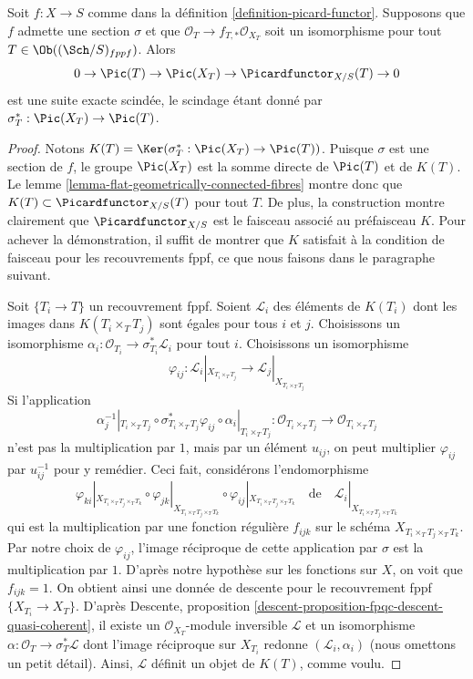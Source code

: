 \begin{lemma}
\label{lemma-flat-geometrically-connected-fibres-with-section}
Soit $f : X \to S$ comme dans la définition \ref{definition-picard-functor}.
Supposons que $f$ admette une section $\sigma$ et que
$\mathcal{O}_T \to f_{T, *}\mathcal{O}_{X_T}$ soit un isomorphisme
pour tout $T \in \Ob((\Sch/S)_{fppf})$. Alors
$$
0 \to \Pic(T) \to \Pic(X_T) \to \Picardfunctor_{X/S}(T) \to 0
$$
est une suite exacte scindée, le scindage étant donné par
$\sigma_T^* : \Pic(X_T) \to \Pic(T)$.
\end{lemma}

\begin{proof}
Notons $K(T) = \Ker(\sigma_T^* : \Pic(X_T) \to \Pic(T))$.
Puisque $\sigma$ est une section de $f$, le groupe $\Pic(X_T)$ est la somme
directe de $\Pic(T)$ et de $K(T)$.
Le lemme \ref{lemma-flat-geometrically-connected-fibres} montre donc que
$K(T) \subset \Picardfunctor_{X/S}(T)$ pour tout $T$. De plus, la construction
montre clairement que $\Picardfunctor_{X/S}$ est le faisceau associé
au préfaisceau $K$. Pour achever la démonstration, il suffit de montrer que
$K$ satisfait à la condition de faisceau pour les recouvrements fppf, ce que nous faisons
dans le paragraphe suivant.

\medskip\noindent
Soit $\{T_i \to T\}$ un recouvrement fppf. Soient $\mathcal{L}_i$ des
éléments de $K(T_i)$ dont les images dans $K(T_i \times_T T_j)$ sont égales
pour tous $i$ et $j$. Choisissons un isomorphisme
$\alpha_i : \mathcal{O}_{T_i} \to \sigma_{T_i}^*\mathcal{L}_i$
pour tout $i$. Choisissons un isomorphisme
$$
\varphi_{ij} :
\mathcal{L}_i|_{X_{T_i \times_T T_j}}
\longrightarrow
\mathcal{L}_j|_{X_{T_i \times_T T_j}}
$$
Si l'application
$$
\alpha_j^{-1}|_{T_i \times_T T_j} \circ
\sigma_{T_i \times_T T_j}^*\varphi_{ij} \circ
\alpha_i|_{T_i \times_T T_j} :
\mathcal{O}_{T_i \times_T T_j} \to \mathcal{O}_{T_i \times_T T_j}
$$
n'est pas la multiplication par $1$, mais par un élément $u_{ij}$, on peut multiplier
$\varphi_{ij}$ par $u_{ij}^{-1}$ pour y remédier. Ceci fait, considérons
l'endomorphisme
$$
\varphi_{ki}|_{X_{T_i \times_T T_j \times_T T_k}} \circ
\varphi_{jk}|_{X_{T_i \times_T T_j \times_T T_k}} \circ
\varphi_{ij}|_{X_{T_i \times_T T_j \times_T T_k}}
\quad\text{de}\quad
\mathcal{L}_i|_{X_{T_i \times_T T_j \times_T T_k}}
$$
qui est la multiplication par une fonction régulière $f_{ijk}$
sur le schéma $X_{T_i \times_T T_j \times_T T_k}$.
Par notre choix de $\varphi_{ij}$, l'image réciproque de
cette application par $\sigma$ est la multiplication par $1$. D'après
notre hypothèse sur les fonctions sur $X$, on voit que $f_{ijk} = 1$.
On obtient ainsi une donnée de descente pour le recouvrement fppf
$\{X_{T_i} \to X_T\}$. D'après
Descente, proposition \ref{descent-proposition-fpqc-descent-quasi-coherent},
il existe un $\mathcal{O}_{X_T}$-module inversible $\mathcal{L}$
et un isomorphisme $\alpha : \mathcal{O}_T \to \sigma_T^*\mathcal{L}$
dont l'image réciproque sur $X_{T_i}$ redonne $(\mathcal{L}_i, \alpha_i)$
(nous omettons un petit détail). Ainsi, $\mathcal{L}$ définit un objet
de $K(T)$, comme voulu.
\end{proof}



